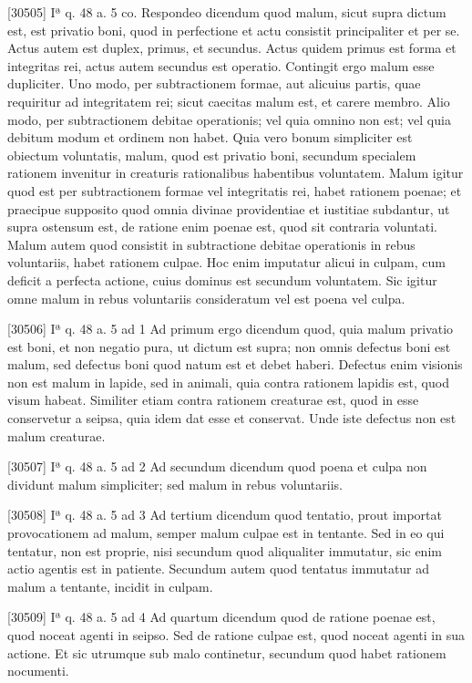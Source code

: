 \documentclass[paper=a4paper,fontsize=10pt,jafontsize=9pt,titlepage]{jlreq}
\begin{document}
[30505] Iª q. 48 a. 5 co. Respondeo dicendum quod malum, sicut supra dictum est, est privatio boni, quod in perfectione et actu consistit principaliter et per se. Actus autem est duplex, primus, et secundus. Actus quidem primus est forma et integritas rei, actus autem secundus est operatio. Contingit ergo malum esse dupliciter. Uno modo, per subtractionem formae, aut alicuius partis, quae requiritur ad integritatem rei; sicut caecitas malum est, et carere membro. Alio modo, per subtractionem debitae operationis; vel quia omnino non est; vel quia debitum modum et ordinem non habet. Quia vero bonum simpliciter est obiectum voluntatis, malum, quod est privatio boni, secundum specialem rationem invenitur in creaturis rationalibus habentibus voluntatem. Malum igitur quod est per subtractionem formae vel integritatis rei, habet rationem poenae; et praecipue supposito quod omnia divinae providentiae et iustitiae subdantur, ut supra ostensum est, de ratione enim poenae est, quod sit contraria voluntati. Malum autem quod consistit in subtractione debitae operationis in rebus voluntariis, habet rationem culpae. Hoc enim imputatur alicui in culpam, cum deficit a perfecta actione, cuius dominus est secundum voluntatem. Sic igitur omne malum in rebus voluntariis consideratum vel est poena vel culpa.

[30506] Iª q. 48 a. 5 ad 1 Ad primum ergo dicendum quod, quia malum privatio est boni, et non negatio pura, ut dictum est supra; non omnis defectus boni est malum, sed defectus boni quod natum est et debet haberi. Defectus enim visionis non est malum in lapide, sed in animali, quia contra rationem lapidis est, quod visum habeat. Similiter etiam contra rationem creaturae est, quod in esse conservetur a seipsa, quia idem dat esse et conservat. Unde iste defectus non est malum creaturae.

[30507] Iª q. 48 a. 5 ad 2 Ad secundum dicendum quod poena et culpa non dividunt malum simpliciter; sed malum in rebus voluntariis.

[30508] Iª q. 48 a. 5 ad 3 Ad tertium dicendum quod tentatio, prout importat provocationem ad malum, semper malum culpae est in tentante. Sed in eo qui tentatur, non est proprie, nisi secundum quod aliqualiter immutatur, sic enim actio agentis est in patiente. Secundum autem quod tentatus immutatur ad malum a tentante, incidit in culpam.

[30509] Iª q. 48 a. 5 ad 4 Ad quartum dicendum quod de ratione poenae est, quod noceat agenti in seipso. Sed de ratione culpae est, quod noceat agenti in sua actione. Et sic utrumque sub malo continetur, secundum quod habet rationem nocumenti.
\end{document}
